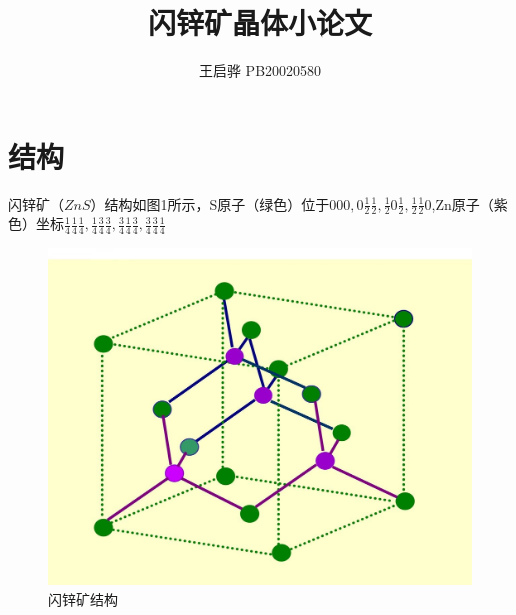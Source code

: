 \documentclass{article}
\title{\songti \zihao{2}\bfseries 闪锌矿晶体小论文}
\author{王启骅 PB20020580}
\begin{document}
	\maketitle
	\section{结构}
闪锌矿$ （ZnS） $结构如图1所示，S原子（绿色）位于$ 000,0\frac{1}{2}\frac{1}{2},\frac{1}{2}0\frac{1}{2},\frac{1}{2}\frac{1}{2}0 $,Zn原子（紫色）坐标$ \frac{1}{4}\frac{1}{4}\frac{1}{4},\frac{1}{4}\frac{3}{4}\frac{3}{4},\frac{3}{4}\frac{1}{4}\frac{3}{4},\frac{3}{4}\frac{3}{4}\frac{1}{4} $
\begin{figure}[!h]
	
	\centering
	\includegraphics[scale=0.2]{结构}
	\caption{\heiti{}闪锌矿结构}
	
\end{figure}
\end{document}
